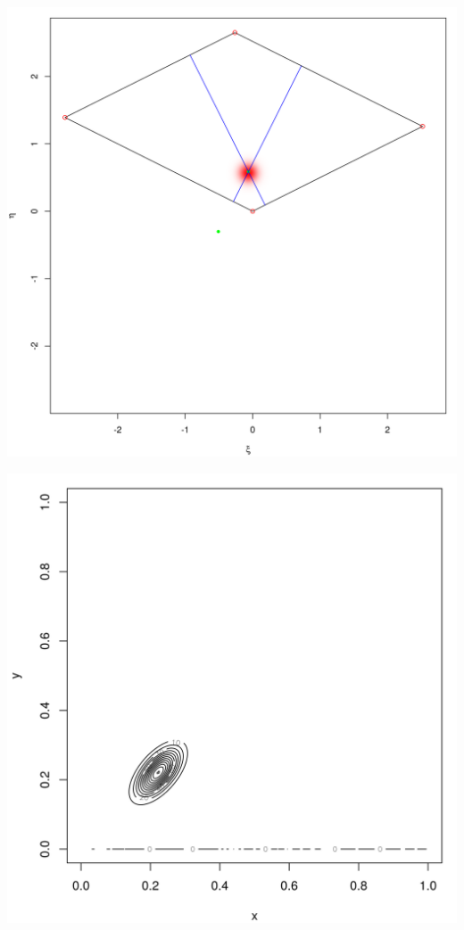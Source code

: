 \documentclass{beamer}
\begin{document}
\begin{frame}
  \centering
  \includegraphics[scale=0.40]{../small-time-solution.png}
\end{frame}
\begin{frame}
  \centering
  \includegraphics[scale=0.55]{../small-time-solution-contour.png}
\end{frame}
\end{document}
